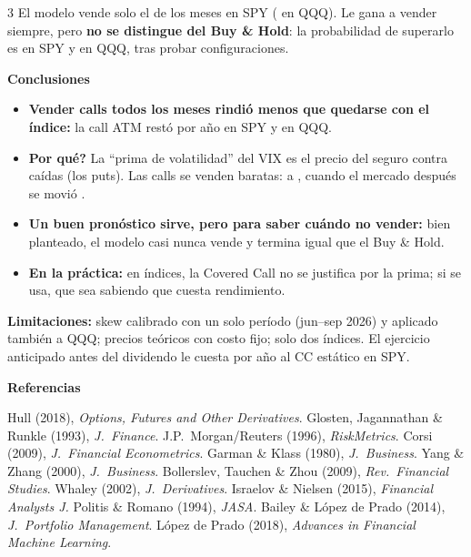 \documentclass[a0,portrait]{a0poster}
\newcommand{\iq}{\textquestiondown}
\renewcommand{\section}[1]{%
  \par\vfill\vspace{0.8cm}%
  {\noindent\raggedright\hyphenpenalty=10000\exhyphenpenalty=10000\color{ku}\Large\bfseries #1\par}%
  \vspace{0.35cm}\noindent}
\begin{document}
\begin{multicols*}{3}
El modelo vende solo el \textbf{\SPYModSold} de los meses en SPY (\QQQModSold{} en QQQ). Le gana a vender siempre, pero \textbf{no se distingue del Buy \& Hold}: la probabilidad de superarlo es \SPYPSRactivo{} en SPY y \QQQPSRactivo{} en QQQ, tras probar \NTrials{} configuraciones.

\section{Conclusiones}

\begin{itemize}[itemsep=0.5em]
  \item \textbf{Vender calls todos los meses rindió menos que quedarse con el índice:} la call ATM restó \SPYStatAporte{} por año en SPY y \QQQStatAporte{} en QQQ.
  \item \textbf{\iq{}Por qué?} La ``prima de volatilidad'' del VIX es el precio del seguro contra caídas (los puts). Las calls se venden baratas: a \SPYIVcall, cuando el mercado después se movió \SPYRV.
  \item \textbf{Un buen pronóstico sirve, pero para saber cuándo no vender:} bien planteado, el modelo casi nunca vende y termina igual que el Buy \& Hold.
  \item \textbf{En la práctica:} en índices, la Covered Call no se justifica por la prima; si se usa, que sea sabiendo que cuesta rendimiento.
\end{itemize}

{\small\textbf{Limitaciones:} skew calibrado con un solo período (jun--sep 2026) y aplicado también a QQQ; precios teóricos con costo fijo; solo dos índices. El ejercicio anticipado antes del dividendo le cuesta \EarlyCost{} por año al CC estático en SPY.\par}

\section{Referencias}
{\footnotesize
Hull (2018), \textit{Options, Futures and Other Derivatives}. \;
Glosten, Jagannathan \& Runkle (1993), \textit{J.\ Finance}. \;
J.P.\ Morgan/Reuters (1996), \textit{RiskMetrics}. \;
Corsi (2009), \textit{J.\ Financial Econometrics}. \;
Garman \& Klass (1980), \textit{J.\ Business}. \;
Yang \& Zhang (2000), \textit{J.\ Business}. \;
Bollerslev, Tauchen \& Zhou (2009), \textit{Rev.\ Financial Studies}. \;
Whaley (2002), \textit{J.\ Derivatives}. \;
Israelov \& Nielsen (2015), \textit{Financial Analysts J.} \;
Politis \& Romano (1994), \textit{JASA}. \;
Bailey \& López de Prado (2014), \textit{J.\ Portfolio Management}. \;
López de Prado (2018), \textit{Advances in Financial Machine Learning}.\par}

\end{multicols*}
\end{document}
